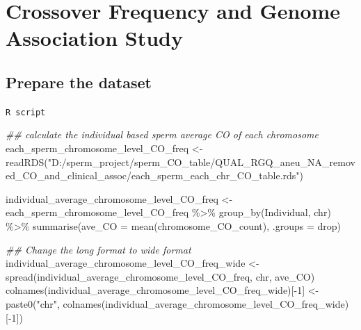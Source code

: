 \documentclass[
  letterpaper,
  DIV=11,
  numbers=noendperiod]{scrreprt}
\newenvironment{Shaded}{\begin{snugshade}}{\end{snugshade}}
\newcommand{\AttributeTok}[1]{\textcolor[rgb]{0.40,0.45,0.13}{#1}}
\newcommand{\DecValTok}[1]{\textcolor[rgb]{0.68,0.00,0.00}{#1}}
\newcommand{\DocumentationTok}[1]{\textcolor[rgb]{0.37,0.37,0.37}{\textit{#1}}}
\newcommand{\FunctionTok}[1]{\textcolor[rgb]{0.28,0.35,0.67}{#1}}
\newcommand{\NormalTok}[1]{\textcolor[rgb]{0.00,0.23,0.31}{#1}}
\newcommand{\OtherTok}[1]{\textcolor[rgb]{0.00,0.23,0.31}{#1}}
\newcommand{\SpecialCharTok}[1]{\textcolor[rgb]{0.37,0.37,0.37}{#1}}
\newcommand{\StringTok}[1]{\textcolor[rgb]{0.13,0.47,0.30}{#1}}
\begin{document}

\hypertarget{crossover-frequency-and-genome-association-study}{%
\chapter{Crossover Frequency and Genome Association
Study}\label{crossover-frequency-and-genome-association-study}}

\hypertarget{prepare-the-dataset}{%
\section{Prepare the dataset}\label{prepare-the-dataset}}

\begin{codelisting}

\caption{\texttt{R script}}

\begin{Shaded}
\begin{Highlighting}[]
\DocumentationTok{\#\# calculate the individual based sperm average CO of each chromosome}
\NormalTok{each\_sperm\_chromosome\_level\_CO\_freq }\OtherTok{\textless{}{-}} \FunctionTok{readRDS}\NormalTok{(}\StringTok{"D:/sperm\_project/sperm\_CO\_table/QUAL\_RGQ\_aneu\_NA\_removed\_CO\_and\_clinical\_assoc/each\_sperm\_each\_chr\_CO\_table.rds"}\NormalTok{)}

\NormalTok{individual\_average\_chromosome\_level\_CO\_freq }\OtherTok{\textless{}{-}}\NormalTok{ each\_sperm\_chromosome\_level\_CO\_freq }\SpecialCharTok{\%\textgreater{}\%} \FunctionTok{group\_by}\NormalTok{(Individual, chr) }\SpecialCharTok{\%\textgreater{}\%} \FunctionTok{summarise}\NormalTok{(}\AttributeTok{ave\_CO =} \FunctionTok{mean}\NormalTok{(chromosome\_CO\_count), }\AttributeTok{.groups =} \StringTok{\textquotesingle{}drop\textquotesingle{}}\NormalTok{)}

\DocumentationTok{\#\# Change the long format to wide format}
\NormalTok{individual\_average\_chromosome\_level\_CO\_freq\_wide }\OtherTok{\textless{}{-}} \FunctionTok{spread}\NormalTok{(individual\_average\_chromosome\_level\_CO\_freq, chr, ave\_CO)}
\FunctionTok{colnames}\NormalTok{(individual\_average\_chromosome\_level\_CO\_freq\_wide)[}\SpecialCharTok{{-}}\DecValTok{1}\NormalTok{] }\OtherTok{\textless{}{-}} \FunctionTok{paste0}\NormalTok{(}\StringTok{"chr"}\NormalTok{, }\FunctionTok{colnames}\NormalTok{(individual\_average\_chromosome\_level\_CO\_freq\_wide)[}\SpecialCharTok{{-}}\DecValTok{1}\NormalTok{])}


\end{Highlighting}
\end{Shaded}
\end{codelisting}
\end{document}

